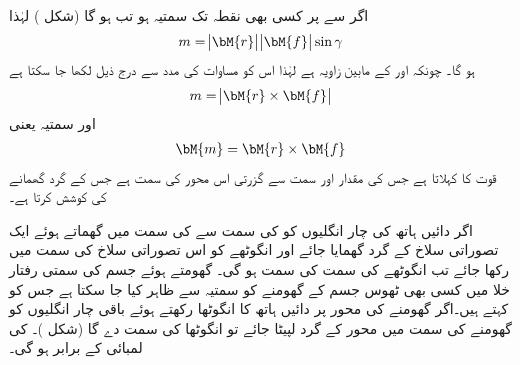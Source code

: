اگر  سے  پر کسی بھی نقطہ  تک سمتیہ  ہو تب  ہو گا (شکل ) لہٰذا 
\begin{align*}
m=\abs{\bM{r}}\abs{\bM{f}}\sin \gamma
\end{align*}
ہو گا۔ چونکہ  اور  کے مابین زاویہ  ہے لہٰذا اس کو مساوات  کی مدد سے  درج ذیل لکھا جا سکتا ہے
\begin{align*}
m=\abs{\bM{r}\times \bM{f}}
\end{align*}
اور سمتیہ  یعنی
\begin{align}
\bM{m}=\bM{r}\times \bM{f}
\end{align}
قوت  کا  کہلاتا ہے جس کی مقدار    اور  سمت  سے گزرتی اس محور کی سمت ہے جس کے گرد    گھمانے کی کوشش کرتا ہے۔

اگر دائیں ہاتھ کی چار انگلیوں کو  کی سمت سے  کی سمت میں گھماتے ہوئے ایک  تصوراتی سلاخ کے گرد  گھمایا جائے اور انگوٹھے  کو اس تصوراتی سلاخ کی سمت میں رکھا جائے تب انگوٹھے کی سمت  کی سمت ہو گی۔ 
\quad گھومتے ہوئے جسم کی سمتی رفتار\\
خلا میں کسی بھی ٹھوس جسم  کے گھومنے کو سمتیہ  سے ظاہر کیا جا سکتا ہے جس کو  کہتے ہیں۔اگر گھومنے کی محور پر دائیں ہاتھ کا انگوٹھا رکھتے ہوئے باقی چار انگلیوں کو گھومنے  کی سمت میں محور کے گرد لپیٹا جائے تو انگوٹھا  کی سمت دے گا  (شکل )۔ کی لمبائی   کے برابر ہو گی۔

